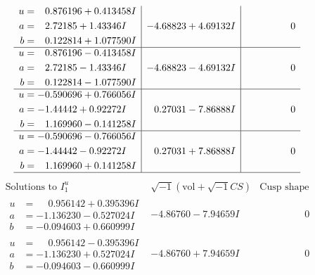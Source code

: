 \documentclass[1p]{elsarticle_modified}
\theoremstyle{definition}
\newcommand{\I}{\sqrt{-1}}
\begin{document}
$$\begin{array}{c|c|c}
\begin{aligned}
u &= \phantom{-}0.876196 + 0.413458 I \\
a &= \phantom{-}2.72185 + 1.43346 I \\
b &= \phantom{-}0.122814 + 1.077590 I\end{aligned}
 & -4.68823 + 4.69132 I & \phantom{-0.000000 } 0 \\ \hline\begin{aligned}
u &= \phantom{-}0.876196 - 0.413458 I \\
a &= \phantom{-}2.72185 - 1.43346 I \\
b &= \phantom{-}0.122814 - 1.077590 I\end{aligned}
 & -4.68823 - 4.69132 I & \phantom{-0.000000 } 0 \\ \hline\begin{aligned}
u &= -0.590696 + 0.766056 I \\
a &= -1.44442 + 0.92272 I \\
b &= \phantom{-}1.169960 - 0.141258 I\end{aligned}
 & \phantom{-}0.27031 - 7.86888 I & \phantom{-0.000000 } 0 \\ \hline\begin{aligned}
u &= -0.590696 - 0.766056 I \\
a &= -1.44442 - 0.92272 I \\
b &= \phantom{-}1.169960 + 0.141258 I\end{aligned}
 & \phantom{-}0.27031 + 7.86888 I & \phantom{-0.000000 } 0\\
 \hline 
 \end{array}$$\newpage$$\begin{array}{c|c|c}  
\text{Solutions to }I^u_{1}& \I (\text{vol} + \sqrt{-1}CS) & \text{Cusp shape}\\
 \hline 
\begin{aligned}
u &= \phantom{-}0.956142 + 0.395396 I \\
a &= -1.136230 - 0.527024 I \\
b &= -0.094603 + 0.660999 I\end{aligned}
 & -4.86760 - 7.94659 I & \phantom{-0.000000 } 0 \\ \hline\begin{aligned}
u &= \phantom{-}0.956142 - 0.395396 I \\
a &= -1.136230 + 0.527024 I \\
b &= -0.094603 - 0.660999 I\end{aligned}
 & -4.86760 + 7.94659 I & \phantom{-0.000000 } 0 \\ \hline\begin{aligned}

\end{aligned}
\end{array}$$
\end{document}
